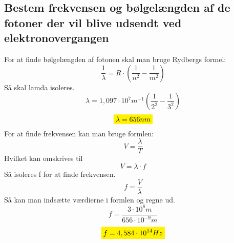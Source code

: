 \subsection{Bestem frekvensen og bølgelængden af de fotoner der vil blive udsendt ved elektronovergangen}
For at finde bølgelængden af fotonen skal man bruge Rydbergs formel: 
\begin{equation*}
    \frac{1}{\lambda}=R \cdot (\frac{1}{n^2} - \frac{1}{m^2} )
\end{equation*}
Så skal lamda isoleres. 
\begin{equation*}
    \lambda = 1,097 \cdot 10^7 m^{-1} (\frac{1}{2^2} - \frac{1}{3^2} )
\end{equation*}
\begin{equation*}
    \mathcolorbox{yellow}{\lambda = 656 nm}
\end{equation*}
For at finde frekvensen kan man bruge formlen:
\begin{equation*}
    V=\frac{\lambda}{T}
\end{equation*}
Hvilket kan omskrives til 
\begin{equation*}
    V=\lambda \cdot f
\end{equation*}
Så isoleres f for at finde frekvensen.
\begin{equation*}
    f=\frac{V}{\lambda}
\end{equation*}
Så kan man indsætte værdierne i formlen og regne ud.
\begin{equation*}
    f=\frac{3 \cdot 10^8 m}{656 \cdot 10^{-9} m}
\end{equation*}
\begin{equation*}
    \mathcolorbox{yellow}{f=4,584 \cdot 10^{14} Hz}
\end{equation*}
\newpage
